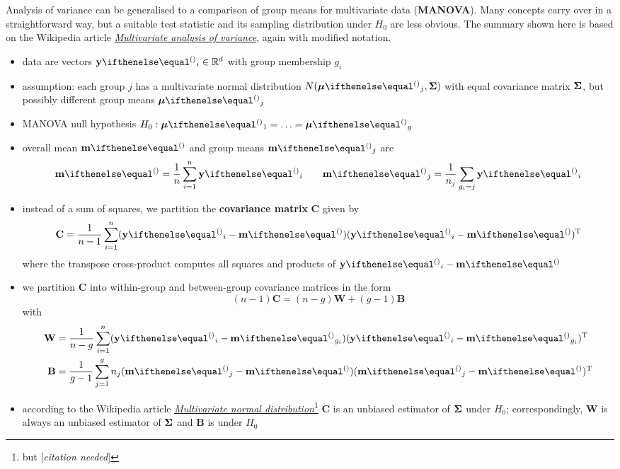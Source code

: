 \documentclass[a4paper]{article}
\begin{document}
Analysis of variance can be generalised to a comparison of group means for multivariate data (\textbf{MANOVA}). Many concepts carry over in a straightforward way, but a suitable test statistic and its sampling distribution under $H_0$ are less obvious. The summary shown here is based on the Wikipedia article \href{https://en.wikipedia.org/wiki/Multivariate_analysis_of_variance}{\emph{Multivariate analysis of variance}}, again with modified notation.

\begin{itemize}
\item data are vectors $\vy_i\in \setR^d$ with group membership $g_i$
\item assumption: each group $j$ has a multivariate normal distribution $N(\vmu_j, \matSigma)$ with equal covariance matrix $\boldsymbol{\Sigma}$, but possibly different group means $\vmu_j$
\item MANOVA null hypothesis $H_0: \vmu_1 = \ldots = \vmu_g$
\item overall mean $\vm$ and group means $\vm_j$ are
  \begin{equation}
    \label{eq:lda:manova:means}
    \vm = \frac1n \sum_{i=1}^n \vy_i \qquad
    \vm_j = \frac1{n_j} \sum_{g_i = j} \vy_i
  \end{equation}
\item instead of a sum of squares, we partition the \textbf{covariance matrix} $\mathbf{C}$ given by
  \begin{equation}
    \label{eq:lda:manova:C}
    \mathbf{C} = \frac1{n-1} \sum_{i=1}^n (\vy_i - \vm) (\vy_i - \vm)\T
  \end{equation}
  where the transpose cross-product computes all squares and products of $\vy_i - \vm$
\item we partition $\mathbf{C}$ into within-group and between-group covariance matrices in the form
  \[
    (n-1) \mathbf{C} = (n - g) \mathbf{W} + (g - 1) \mathbf{B}
  \]
  with
  \begin{align}
    \label{eq:lda:manova:W}
    \mathbf{W} &= \frac1{n - g} \sum_{i=1}^n (\vy_i - \vm_{g_i}) (\vy_i - \vm_{g_i})\T \\
    \label{eq:lda:manova:B}
    \mathbf{B} &= \frac1{g - 1} \sum_{j=1}^g n_j (\vm_j - \vm) (\vm_j - \vm)\T
  \end{align}
  \citep[cf.][191--192]{Bishop:06}
\item according to the Wikipedia article \href{https://en.wikipedia.org/wiki/Multivariate_normal_distribution\#Parameter_estimation}{\emph{Multivariate normal distribution}}\footnote{but [\emph{citation needed}]} $\mathbf{C}$ is an unbiased estimator of $\boldsymbol{\Sigma}$ under $H_0$; correspondingly, $\mathbf{W}$ is always an unbiased estimator of $\boldsymbol{\Sigma}$ and $\mathbf{B}$ is under $H_0$

\end{itemize}
\end{document}
